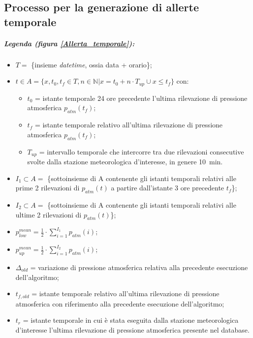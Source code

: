 \subsection{Processo per la generazione di allerte temporale}

\subparagraph{Legenda (figura \ref{Allerta_temporale}):}
\begin{itemize}
	\item $T = $ \{insieme \textit{datetime}, ossia data + orario\};
	\item $t \in A = \{x, t_0, t_f \in T, n \in \mathbb{N}| x = t_0 + n \cdot T_{up} \cup x \leq t_f\}$ con:
	\begin{itemize}
		\item $t_0$ = istante temporale 24 ore precedente l'ultima rilevazione di pressione atmosferica $p_{atm}(t_f)$;
		\item $t_f$ = istante temporale relativo all'ultima rilevazione di pressione atmosferica $p_{atm}(t_f)$;   
		\item $T_{up}$ = intervallo temporale che intercorre tra due rilevazioni consecutive svolte dalla stazione meteorologica d'interesse, in genere \SI{10}{\minute}.  
	\end{itemize}
	\item $I_1 \subset A = $ \{sottoinsieme di A contenente gli istanti temporali relativi alle prime 2 rilevazioni di $p_{atm}(t)$ a partire dall'istante 3 ore precedente $t_f$\};
	\item $I_2 \subset A = $ \{sottoinsieme di A contenente gli istanti temporali relativi alle ultime 2 rilevazioni di $p_{atm}(t)$\};
	\item $p^{mean}_{low} = \frac{1}{2} \cdot \sum_{i = 1}^{I_1} p_{atm}(i)$;
	\item $p^{mean}_{up} = \frac{1}{2} \cdot \sum_{i = 1}^{I_2} p_{atm}(i)$;
	\item $\Delta_{old}$ = variazione di pressione atmosferica relativa alla precedente esecuzione dell'algoritmo;
	\item $t_{f, old}$ = istante temporale relativo all'ultima rilevazione di pressione atmosferica con riferimento alla precedente esecuzione dell'algoritmo;
	\item $t_r$ = istante temporale in cui è stata eseguita dalla stazione meteorologica d'interesse l'ultima rilevazione di pressione atmosferica presente nel database. 
\end{itemize}

